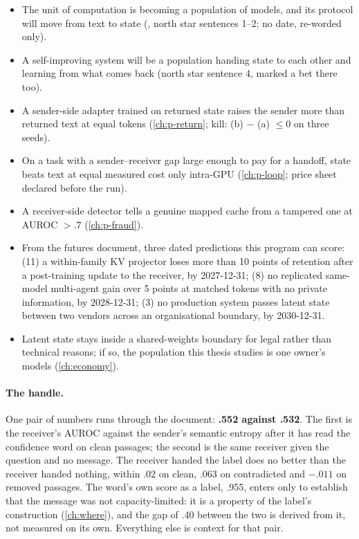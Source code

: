 \documentclass[11pt,a4paper]{report}
\begin{document}
\begin{tcolorbox}[enhanced,breakable,colback=betc!4,colframe=betc,boxrule=0.6pt,arc=1pt,title={\textbf{BET} (no evidence yet; each carries a date or a kill criterion)}]
\small
\begin{itemize}[leftmargin=1.2em]
\item The unit of computation is becoming a population of models, and its protocol will move from text to state (, north star sentences 1--2; no date, re-worded only).
\item A self-improving system will be a population handing state to each other and learning from what comes back (north star sentence 4, marked a bet there too).
\item A sender-side adapter trained on returned state raises the sender more than returned text at equal tokens (\cref{ch:p-return}; kill: (b) $-$ (a) $\le 0$ on three seeds).
\item On a task with a sender--receiver gap large enough to pay for a handoff, state beats text at equal measured cost only intra-GPU (\cref{ch:p-loop}; price sheet declared before the run).
\item A receiver-side detector tells a genuine mapped cache from a tampered one at AUROC $> .7$ (\cref{ch:p-fraud}).
\item From the futures document, three dated predictions this program can score: (11) a within-family KV projector loses more than 10 points of retention after a post-training update to the receiver, by 2027-12-31; (8) no replicated same-model multi-agent gain over 5 points at matched tokens with no private information, by 2028-12-31; (3) no production system passes latent state between two vendors across an organisational boundary, by 2030-12-31.
\item Latent state stays inside a shared-weights boundary for legal rather than technical reasons; if so, the population this thesis studies is one owner's models (\cref{ch:economy}).
\end{itemize}
\end{tcolorbox}

\paragraph{The handle.} One pair of numbers runs through the document: \textbf{.552 against .532}. The first is the receiver's AUROC against the sender's semantic entropy after it has read the confidence word on clean passages; the second is the same receiver given the question and no message. The receiver handed the label does no better than the receiver handed nothing, within .02 on clean, .063 on contradicted and $-.011$ on removed passages. The word's own score as a label, .955, enters only to establish that the message was not capacity-limited: it is a property of the label's construction (\cref{ch:where}), and the gap of .40 between the two is derived from it, not measured on its own. Everything else is context for that pair.
\end{document}

